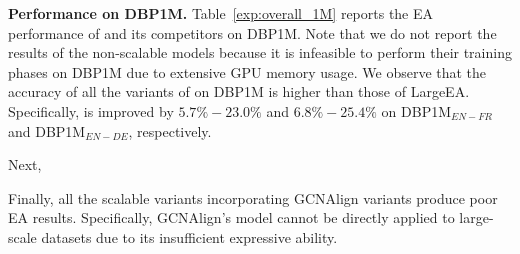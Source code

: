 \noindent
\textbf{Performance on DBP1M.}
Table~\ref{exp:overall_1M} reports the EA performance of \ClusterEA{} and its competitors on DBP1M. Note that we do not report the results of the non-scalable models because it is infeasible to perform their training phases on DBP1M due to extensive GPU memory usage.
We observe that the accuracy of all the variants of \ClusterEA{} on DBP1M  is higher than those of LargeEA. Specifically, \HitOne{} is improved by $5.7\%-23.0\%$ and $6.8\%-25.4\%$ on DBP1M$_{EN-FR}$ and DBP1M$_{EN-DE}$, respectively.
 
Next, 

Finally, all the scalable variants incorporating GCNAlign variants produce poor EA results. Specifically, GCNAlign's model cannot be directly applied to large-scale datasets due to its insufficient expressive ability.



